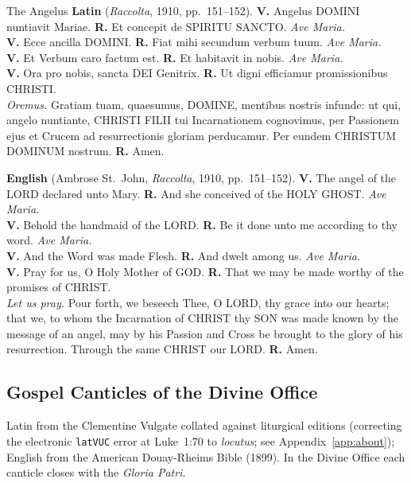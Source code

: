 \begin{massbox}{The Angelus}
\textbf{Latin} (\textit{Raccolta}, 1910, pp.~151--152). \textbf{V.} Angelus
DOMINI nuntiavit Mariae. \textbf{R.} Et concepit de SPIRITU SANCTO. \textit{Ave
Maria.}\\
\textbf{V.} Ecce ancilla DOMINI. \textbf{R.} Fiat mihi secundum verbum tuum.
\textit{Ave Maria.}\\
\textbf{V.} Et Verbum caro factum est. \textbf{R.} Et habitavit in nobis.
\textit{Ave Maria.}\\
\textbf{V.} Ora pro nobis, sancta DEI Genitrix. \textbf{R.} Ut digni efficiamur
promissionibus CHRISTI.\\
\textit{Oremus.} Gratiam tuam, quaesumus, DOMINE, mentibus nostris infunde: ut
qui, angelo nuntiante, CHRISTI FILII tui Incarnationem cognovimus, per Passionem
ejus et Crucem ad resurrectionis gloriam perducamur. Per eundem CHRISTUM DOMINUM
nostrum. \textbf{R.} Amen.

\textbf{English} (Ambrose St.~John, \textit{Raccolta}, 1910, pp.~151--152).
\textbf{V.} The angel of the LORD declared unto Mary. \textbf{R.} And she
conceived of the HOLY GHOST. \textit{Ave Maria.}\\
\textbf{V.} Behold the handmaid of the LORD. \textbf{R.} Be it done unto me
according to thy word. \textit{Ave Maria.}\\
\textbf{V.} And the Word was made Flesh. \textbf{R.} And dwelt among us.
\textit{Ave Maria.}\\
\textbf{V.} Pray for us, O Holy Mother of GOD. \textbf{R.} That we may be made
worthy of the promises of CHRIST.\\
\textit{Let us pray.} Pour forth, we beseech Thee, O LORD, thy grace into our
hearts; that we, to whom the Incarnation of CHRIST thy SON was made known by the
message of an angel, may by his Passion and Cross be brought to the glory of his
resurrection. Through the same CHRIST our LORD. \textbf{R.} Amen.
\end{massbox}

\subsection{Gospel Canticles of the Divine Office}

Latin from the Clementine Vulgate collated against liturgical editions
(correcting the electronic \texttt{latVUC} error at Luke~1:70 to
\textit{locutus}; see Appendix~\ref{app:about}); English from the American
Douay-Rheims Bible (1899). In the Divine Office each canticle closes with the
\textit{Gloria Patri}.

